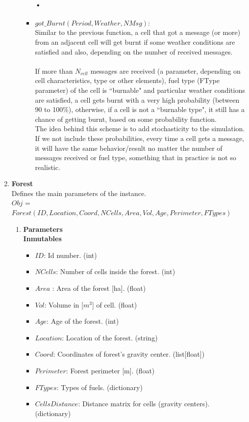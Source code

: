\documentclass[11pt]{article}
\begin{document}
\begin{enumerate}
\begin{enumerate}
\begin{itemize}
 	\paragraph{•}		 			
 			\item $got\_Burnt(Period,Weather,NMsg)$:\\
 			Similar to the previous function, a cell that got a message (or more) from an adjacent cell will get burnt if some weather conditions are satisfied and also, depending on the number of received messages. \\ \\
 			 If more than $N_{cell}$ messages are received (a parameter, depending on cell characteristics, type or other elements), fuel type (FType parameter) of the cell is ``burnable" and particular weather conditions are satisfied, a cell gets burnt with a very high probability (between 90 to 100\%), otherwise, if a cell is not a ``burnable type", it still has a chance of getting burnt, based on some probability function. \\
 			
 			The idea behind this scheme is to add stochasticity to the simulation. If we not include these probabilities, every time a cell gets a message, it will have the same behavior/result no matter the number of messages received or fuel type, something that in practice is not so realistic.  
 			
\end{itemize} 		
\end{enumerate}

	
	
	\item \textbf{Forest}\\
	Defines the main parameters of the instance.\\ $Obj$ = $Forest(ID,Location,Coord,NCells,Area,Vol,Age,Perimeter,FTypes)$
\begin{enumerate}
 		\item \textbf{Parameters}\\
 		\textbf{Inmutables} 
 			\begin{itemize}
 				\item $ID$: Id number. \hfill (int) 
 				\item $NCells$: Number of cells inside the forest. \hfill (int) 
 				\item $Area$ : Area of the forest [ha]. \hfill (float)
 				\item $Vol$: Volume in [$m^{3}$] of cell. \hfill (float) 
 				\item $Age$: Age of the forest. \hfill (int) 
 				\item $Location$: Location of the forest. \hfill (string)
 				\item $Coord$: Coordinates of forest's gravity center. \hfill (list[float])
 				\item $Perimeter$: Forest perimeter [m]. \hfill (float)
 				\item $FTypes$: Types of fuels. \hfill (dictionary)
 				\item $CellsDistance$: Distance matrix for cells (gravity centers). \hfill (dictionary)
 			\end{itemize}
 			

\end{enumerate}
\end{enumerate}
\end{document}
